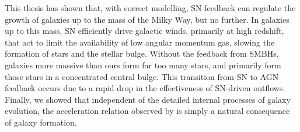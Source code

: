 This thesis has shown that, with correct modelling, SN feedback can regulate the
growth of galaxies up to the mass of the Milky Way, but no further.  In galaxies
up to this mass, SN efficiently drive galactic winds, primarily at
high redshift, that act to limit the availability of low angular momentum gas,
slowing the formation of stars and the stellar bulge. Without the
feedback from SMBHs, galaxies more massive than ours form far too many stars,
and primarily form those stars in a concentrated central bulge.  This transition
from SN to AGN feedback occurs due to a rapid drop in the effectiveness of
SN-driven outflows.  Finally, we showed that independent of the detailed
internal processes of galaxy evolution, the acceleration relation observed by
\citet{McGaugh2016} is simply a natural consequence of galaxy formation.

